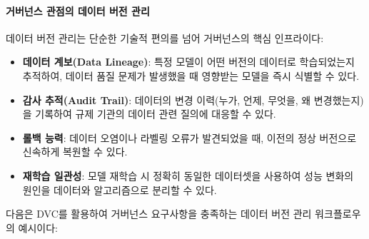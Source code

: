 \paragraph{거버넌스 관점의 데이터 버전 관리}

데이터 버전 관리는 단순한 기술적 편의를 넘어 거버넌스의 핵심 인프라이다\cite{gebru2021datasheets}:

\begin{itemize}
    \item \textbf{데이터 계보(Data Lineage)}: 특정 모델이 어떤 버전의 데이터로 학습되었는지 추적하여, 데이터 품질 문제가 발생했을 때 영향받는 모델을 즉시 식별할 수 있다\cite{breck2019data}.
    \item \textbf{감사 추적(Audit Trail)}: 데이터의 변경 이력(누가, 언제, 무엇을, 왜 변경했는지)을 기록하여 규제 기관의 데이터 관련 질의에 대응할 수 있다.
    \item \textbf{롤백 능력}: 데이터 오염이나 라벨링 오류가 발견되었을 때, 이전의 정상 버전으로 신속하게 복원할 수 있다.
    \item \textbf{재학습 일관성}: 모델 재학습 시 정확히 동일한 데이터셋을 사용하여 성능 변화의 원인을 데이터와 알고리즘으로 분리할 수 있다.
\end{itemize}

다음은 DVC를 활용하여 거버넌스 요구사항을 충족하는 데이터 버전 관리 워크플로우의 예시이다:

